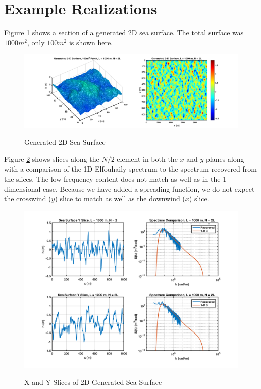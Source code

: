 \section{Example Realizations}
Figure \ref{os_fig:8} shows a section of a generated 2D sea surface. The total surface was $1000 m^2$, only $100 m^2$ is shown here.
\begin{figure}[H]
  \begin{center}
\includegraphics[width=6in]{../media/Ocean_Surface/sea_surface_2d_surf.png}
  \end{center}
  \renewcommand{\baselinestretch}{1} \small\normalsize
  \begin{quote}
    \caption[Generated 2D Sea Surface]{Generated 2D Sea Surface \label{os_fig:8}}
  \end{quote}
\end{figure}
\renewcommand{\baselinestretch}{2} \small\normalsize

Figure \ref{os_fig:10} shows slices along the $N/2$ element in both the $x$ and $y$ planes along with a comparison of the 1D Elfouhaily spectrum to the spectrum recovered from the slices. The low frequency content does not match as well as in the 1-dimensional case. Because we have added a spreading function, we do not expect the crosswind ($y$) slice to match as well as the downwind ($x$) slice.
\begin{figure}[H]
  \begin{center}
\includegraphics[width=6in]{../media/Ocean_Surface/sea_surface_2d_slices1000.png}
  \end{center}
  \renewcommand{\baselinestretch}{1} \small\normalsize
  \begin{quote}
    \caption[X and Y Slices of 2D Generated Sea Surface]{X and Y Slices of 2D Generated Sea Surface\label{os_fig:10}}
  \end{quote}
\end{figure}
\renewcommand{\baselinestretch}{2} \small\normalsize